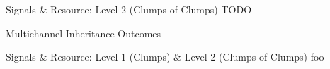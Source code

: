 \begin{frame}{Signals \& Resource: Level 2 {\small(Clumps of Clumps)}}
TODO
\end{frame}

\begin{frame}{Multichannel Inheritance Outcomes}
  
\end{frame}

\begin{frame}{Signals \& Resource: Level 1 {\small(Clumps)} \& Level 2 {\small(Clumps of Clumps)}}%
  foo
\end{frame}

